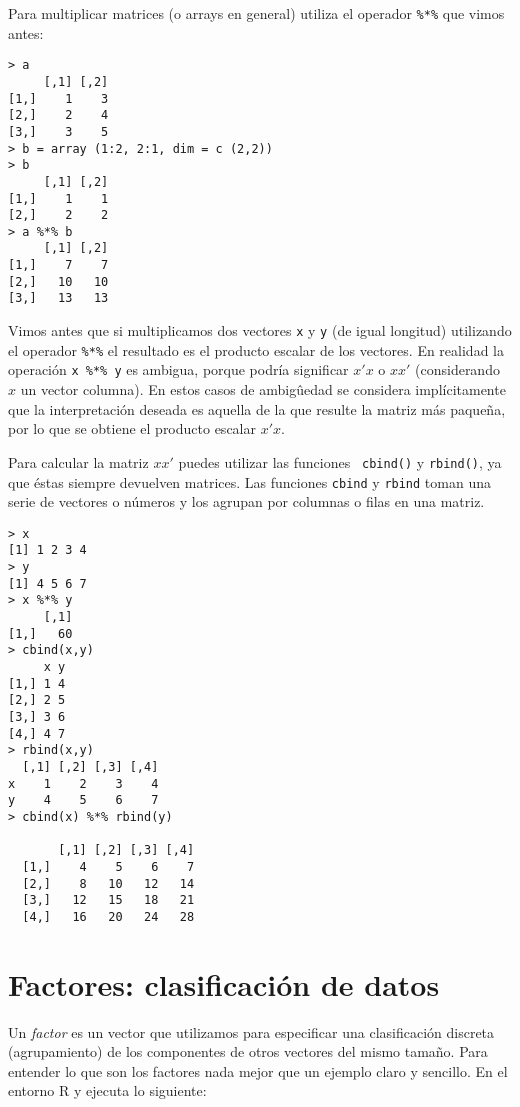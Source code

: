 Para multiplicar  matrices (o arrays  en general) utiliza  el operador
\verb|%*%| que vimos antes:


\begin{verbatim}
> a
     [,1] [,2]
[1,]    1    3
[2,]    2    4
[3,]    3    5
> b = array (1:2, 2:1, dim = c (2,2))
> b
     [,1] [,2]
[1,]    1    1
[2,]    2    2
> a %*% b
     [,1] [,2]
[1,]    7    7
[2,]   10   10
[3,]   13   13
\end{verbatim}

Vimos antes  que si multiplicamos dos  vectores {\tt x} y  {\tt y} (de
igual longitud) utilizando el operador  {\tt \%*\%} el resultado es el
producto  escalar de  los vectores.  En realidad  la operación  {\tt x
\%*\%  y}  es ambigua,  porque  podría  significar  $x'  x$ o  $x  x'$
(considerando $x$ un vector columna).  En estos casos de ambigûedad se
considera implícitamente  que la interpretación deseada  es aquella de
la  que resulte  la  matriz más  paqueña,  por lo  que  se obtiene  el
producto escalar $x' x$.

Para  calcular la  matriz $x  x'$ puedes  utilizar las  funciones {\tt
cbind()} y {\tt rbind()}, ya que éstas siempre devuelven matrices. Las
funciones {\tt  cbind} y  {\tt rbind}  toman una  serie de  vectores o
números y los agrupan por columnas o filas en una matriz.


\begin{verbatim}
> x
[1] 1 2 3 4
> y
[1] 4 5 6 7
> x %*% y
     [,1]
[1,]   60
> cbind(x,y)
     x y
[1,] 1 4
[2,] 2 5
[3,] 3 6
[4,] 4 7
> rbind(x,y)
  [,1] [,2] [,3] [,4]
x    1    2    3    4
y    4    5    6    7
> cbind(x) %*% rbind(y)
      
       [,1] [,2] [,3] [,4]
  [1,]    4    5    6    7
  [2,]    8   10   12   14
  [3,]   12   15   18   21
  [4,]   16   20   24   28
\end{verbatim}


\section{Factores: clasificación de datos}


Un  {\em factor}  es un  vector  que utilizamos  para especificar  una
clasificación  discreta (agrupamiento)  de  los  componentes de  otros
vectores del mismo tamaño. Para entender  lo que son los factores nada
mejor que un ejemplo claro y sencillo. En el entorno {\sf R} y ejecuta
lo siguiente:

